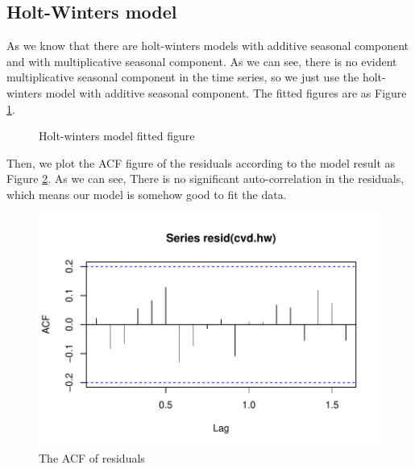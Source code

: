 \documentclass{article}
\begin{document}
\vspace{4pt}
\subsection{Holt-Winters model}

As we know that there are holt-winters models with additive seasonal component and with multiplicative seasonal component. 
As we can see, there is no evident multiplicative seasonal component in the time series, so we just use the holt-winters model 
with additive seasonal component. The fitted figures are as Figure \ref{hw}.

\begin{figure}[H]
    \centering
    \quad
    \caption{Holt-winters model fitted figure}
    \label{hw}
\end{figure}
Then, we plot the ACF figure of the residuals according to the model result as Figure \ref{acf1}. As we can see, There is no significant auto-correlation in the residuals, which means our model is 
somehow good to fit the data.
\begin{figure}[htbp]
    \centering
    \includegraphics[width=0.65\linewidth]{images/cvd-hw-res-acf}
    \caption{The ACF of residuals}
    \label{acf1}
\end{figure}
\end{document}
